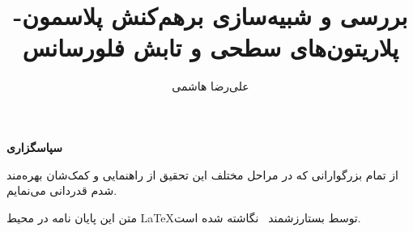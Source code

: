 \documentclass[twoside,12pt,floatfix,openright,fleqn,final]{shiraz_thesis}%
\begin{document}
\title{بررسی و شبیه‌سازی برهم‌کنش پلاسمون-پلاریتون‌های سطحی و تابش فلورسانس }
\author{علی‌رضا هاشمی}
\subject{رساله}

\makeonvan



\BISMILLAH
\ezharname
\signpage

 \begin{acknowledgementpage}
\centerline{\bfseries{سپاسگزاری}\normalfont}
\vskip 28pt
از تمام بزرگوارانی که در مراحل مختلف این تحقیق از راهنمایی و کمک‌شان بهره‌مند شدم قدردانی می‌نمایم.

متن این پایان نامه در محیط \LaTeX توسط بست\heye ارزشمند \XePersian ~نگاشته شده است.
\end{acknowledgementpage}

\pagestyle{plain}
\end{document}
